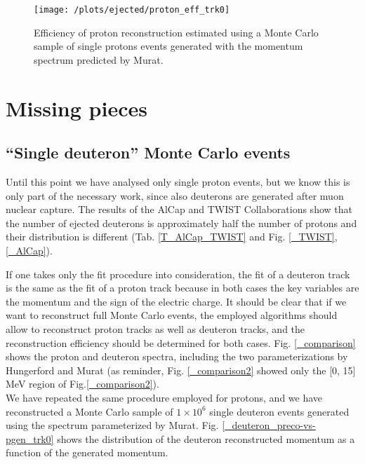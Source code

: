 \documentclass[12pt,a4paper,openright, oneside, titlepage]{book} %
\begin{document}
\begin{figure}[!htb]
\centering
\texttt{[image: /plots/ejected/proton\_eff\_trk0]}
\caption[Efficiency of proton reconstruction]
{Efficiency of proton reconstruction estimated using a Monte Carlo sample of single protons events 
generated with the momentum spectrum predicted by Murat.}
\label{_proton_eff_trk0}
\end{figure}

\section{Missing pieces}
\subsection{``Single deuteron'' Monte Carlo events}
Until this point we have analysed only single proton events, 
but we know this is only part of the necessary work, 
since also deuterons are generated after muon nuclear capture.
The results of the AlCap and TWIST Collaborations
show that the number of ejected deuterons is approximately 
half the number of protons and their distribution is different
(Tab. \ref{T_AlCap_TWIST} and Fig.  \ref{_TWIST},  \ref{_AlCap}).

\noindent
If one takes only the fit procedure into consideration, 
the fit of a deuteron track is the same as the fit of a proton track because 
in both cases the key variables are the momentum and the sign of the electric charge.
It should be clear that if we want to reconstruct full Monte Carlo events,
the employed algorithms should allow to reconstruct proton tracks as well as deuteron tracks,
and the reconstruction efficiency should be determined for both cases.
Fig. \ref{_comparison} shows the proton and deuteron spectra, including
the two parameterizations by Hungerford and Murat
(as reminder, Fig. \ref{_comparison2} showed only the 
[0, 15] MeV region of Fig.\ref{_comparison2}).\\
We have repeated the same procedure employed for protons,
and we have reconstructed a Monte Carlo sample of $1 \times 10^6$ single deuteron events
generated using the spectrum parameterized by Murat. 
Fig. \ref{_deuteron_preco-vs-pgen_trk0} shows the distribution of the deuteron reconstructed momentum 
as a function of the generated momentum. 
\end{document}
